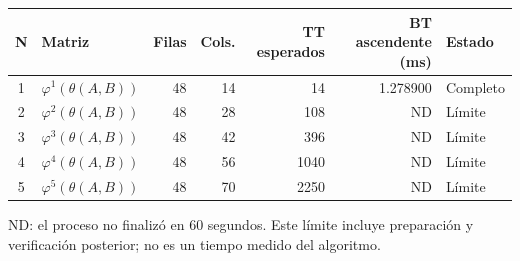 \begin{tabular}{c l r r r r l}
\toprule
N & Matriz & Filas & Cols. & TT esperados & BT ascendente (ms) & Estado \\
\midrule
1 & $\varphi^{1}(\theta(A,B))$ & 48 & 14 & 14 & 1.278900 & Completo \\
2 & $\varphi^{2}(\theta(A,B))$ & 48 & 28 & 108 & ND & Límite \\
3 & $\varphi^{3}(\theta(A,B))$ & 48 & 42 & 396 & ND & Límite \\
4 & $\varphi^{4}(\theta(A,B))$ & 48 & 56 & 1040 & ND & Límite \\
5 & $\varphi^{5}(\theta(A,B))$ & 48 & 70 & 2250 & ND & Límite \\
\bottomrule
\end{tabular}
{\footnotesize ND: el proceso no finalizó en 60 segundos. Este límite incluye preparación y verificación posterior; no es un tiempo medido del algoritmo.\par}
